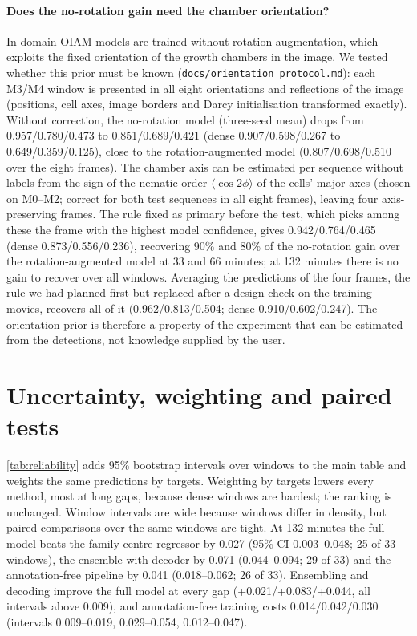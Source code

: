\documentclass[10pt,twocolumn,letterpaper]{article}
\begin{document}
\paragraph{Does the no-rotation gain need the chamber orientation?}
In-domain OIAM models are trained without rotation augmentation, which exploits the fixed orientation of the growth chambers in the image. We tested whether this prior must be known (\texttt{docs/orientation\_protocol.md}): each M3/M4 window is presented in all eight orientations and reflections of the image (positions, cell axes, image borders and Darcy initialisation transformed exactly). Without correction, the no-rotation model (three-seed mean) drops from 0.957/0.780/0.473 to 0.851/0.689/0.421 (dense 0.907/0.598/0.267 to 0.649/0.359/0.125), close to the rotation-augmented model (0.807/0.698/0.510 over the eight frames). The chamber axis can be estimated per sequence without labels from the sign of the nematic order $\langle\cos 2\phi\rangle$ of the cells' major axes (chosen on M0--M2; correct for both test sequences in all eight frames), leaving four axis-preserving frames. The rule fixed as primary before the test, which picks among these the frame with the highest model confidence, gives 0.942/0.764/0.465 (dense 0.873/0.556/0.236), recovering 90\% and 80\% of the no-rotation gain over the rotation-augmented model at 33 and 66 minutes; at 132 minutes there is no gain to recover over all windows. Averaging the predictions of the four frames, the rule we had planned first but replaced after a design check on the training movies, recovers all of it (0.962/0.813/0.504; dense 0.910/0.602/0.247). The orientation prior is therefore a property of the experiment that can be estimated from the detections, not knowledge supplied by the user.

\section{Uncertainty, weighting and paired tests}
\cref{tab:reliability} adds 95\% bootstrap intervals over windows to the main table and weights the same predictions by targets.
Weighting by targets lowers every method, most at long gaps, because dense windows are hardest; the ranking is unchanged.
Window intervals are wide because windows differ in density, but paired comparisons over the same windows are tight.
At 132 minutes the full model beats the family-centre regressor by 0.027 (95\% CI 0.003--0.048; 25 of 33 windows), the ensemble with decoder by 0.071 (0.044--0.094; 29 of 33) and the annotation-free pipeline by 0.041 (0.018--0.062; 26 of 33).
Ensembling and decoding improve the full model at every gap (+0.021/+0.083/+0.044, all intervals above 0.009), and annotation-free training costs 0.014/0.042/0.030 (intervals 0.009--0.019, 0.029--0.054, 0.012--0.047).

\end{document}
